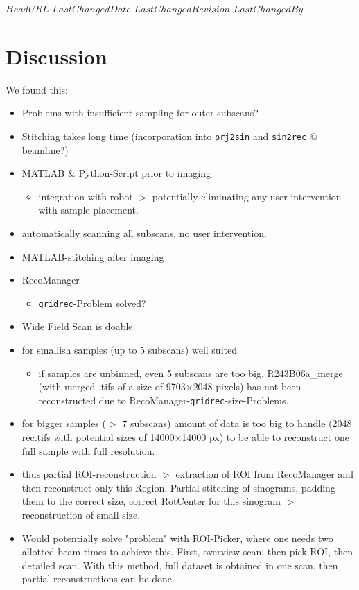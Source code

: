 \svnidlong
{$HeadURL$}
{$LastChangedDate$}
{$LastChangedRevision$}
{$LastChangedBy$}

\begin{center}
\end{center}

\section{Discussion}
We found this:
\begin{itemize}
	\item Problems with insufficient sampling for outer subscans?
	\item Stitching takes long time (incorporation into \verb+prj2sin+ and \verb+sin2rec+ @ beamline?)
	\item MATLAB \& Python-Script prior to imaging
	\begin{itemize}
		\item integration with robot $>$ potentially eliminating any user intervention with sample placement.
	\end{itemize}
	\item automatically scanning all subscans, no user intervention.
	\item MATLAB-stitching after imaging
	\item RecoManager
	\begin{itemize}
		\item \verb+gridrec+-Problem solved?
	\end{itemize}
	\item Wide Field Scan is doable
	\item for smallish samples (up to 5 subscans) well suited
	\begin{itemize}
		\item if samples are unbinned, even 5 subscans are too big, R243B06a\_merge (with merged .tifs of a size of 9703$\times$2048 pixels) has not been reconstructed due to RecoManager-\verb+gridrec+-size-Problems.
	\end{itemize}
	\item for bigger samples ($>$ 7 subscans) amount of data is too big to handle (2048 rec.tifs with potential sizes of 14000$\times$14000 px) to be able to reconstruct one full sample with full resolution.
	\item thus partial ROI-reconstruction $>$ extraction of ROI from RecoManager and then reconstruct only this Region. Partial stitching of sinograms, padding them to the correct size, correct RotCenter for this sinogram $>$ reconstruction of small size.
	\item Would potentially solve "problem" with ROI-Picker, where one needs two allotted beam-times to achieve this. First, overview scan, then pick ROI, then detailed scan. With this method, full dataset is obtained in one scan, then partial reconstructions can be done.
\end{itemize}